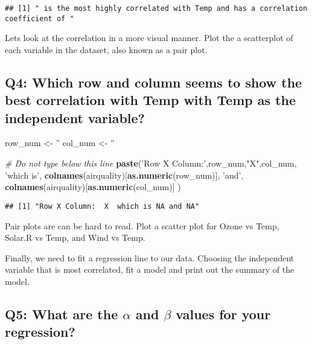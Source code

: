 \documentclass[]{book}
\newenvironment{Shaded}{\begin{snugshade}}{\end{snugshade}}
\newcommand{\KeywordTok}[1]{\textcolor[rgb]{0.13,0.29,0.53}{\textbf{#1}}}
\newcommand{\StringTok}[1]{\textcolor[rgb]{0.31,0.60,0.02}{#1}}
\newcommand{\CommentTok}[1]{\textcolor[rgb]{0.56,0.35,0.01}{\textit{#1}}}
\newcommand{\NormalTok}[1]{#1}
\begin{document}
\begin{verbatim}
## [1] " is the most highly correlated with Temp and has a correlation coefficient of "
\end{verbatim}

Lets look at the correlation in a more visual manner. Plot the a
scatterplot of each variable in the dataset, also known as a pair plot.

\subsection{Q4: Which row and column seems to show the best correlation
with Temp with Temp as the independent
variable?}\label{q4-which-row-and-column-seems-to-show-the-best-correlation-with-temp-with-temp-as-the-independent-variable}

\begin{Shaded}
\begin{Highlighting}[]
\NormalTok{row_num <-}\StringTok{ ''}
\NormalTok{col_num <-}\StringTok{ ''}

\CommentTok{# Do not type below this line}
\KeywordTok{paste}\NormalTok{(}\StringTok{'Row X Column:'}\NormalTok{,row_num,}\StringTok{"X"}\NormalTok{,col_num, }\StringTok{'which is'}\NormalTok{, }\KeywordTok{colnames}\NormalTok{(airquality)[}\KeywordTok{as.numeric}\NormalTok{(row_num)], }\StringTok{'and'}\NormalTok{, }\KeywordTok{colnames}\NormalTok{(airquality)[}\KeywordTok{as.numeric}\NormalTok{(col_num)] )}
\end{Highlighting}
\end{Shaded}

\begin{verbatim}
## [1] "Row X Column:  X  which is NA and NA"
\end{verbatim}

Pair plots are can be hard to read. Plot a scatter plot for Ozone vs
Temp, Solar.R vs Temp, and Wind vs Temp.

Finally, we need to fit a regression line to our data. Choosing the
independent variable that is most correlated, fit a model and print out
the summary of the model.

\subsection{\texorpdfstring{Q5: What are the \(\alpha\) and \(\beta\)
values for your
regression?}{Q5: What are the \textbackslash{}alpha and \textbackslash{}beta values for your regression?}}\label{q5-what-are-the-alpha-and-beta-values-for-your-regression}
\end{document}
